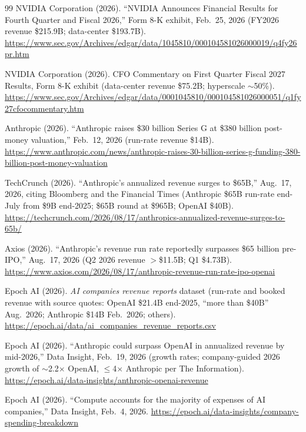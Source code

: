 \documentclass[11pt,letterpaper]{article}
\begin{document}
\begin{thebibliography}{99}
NVIDIA Corporation (2026). ``NVIDIA Announces Financial Results for Fourth Quarter and Fiscal 2026,'' Form 8-K exhibit, Feb.~25, 2026 (FY2026 revenue \$215.9B; data-center \$193.7B). \url{https://www.sec.gov/Archives/edgar/data/1045810/000104581026000019/q4fy26pr.htm}

NVIDIA Corporation (2026). CFO Commentary on First Quarter Fiscal 2027 Results, Form 8-K exhibit (data-center revenue \$75.2B; hyperscale $\sim$50\%). \url{https://www.sec.gov/Archives/edgar/data/0001045810/000104581026000051/q1fy27cfocommentary.htm}

Anthropic (2026). ``Anthropic raises \$30 billion Series G at \$380 billion post-money valuation,'' Feb.~12, 2026 (run-rate revenue \$14B). \url{https://www.anthropic.com/news/anthropic-raises-30-billion-series-g-funding-380-billion-post-money-valuation}

TechCrunch (2026). ``Anthropic's annualized revenue surges to \$65B,'' Aug.~17, 2026, citing Bloomberg and the Financial Times (Anthropic \$65B run-rate end-July from \$9B end-2025; \$65B round at \$965B; OpenAI \$40B). \url{https://techcrunch.com/2026/08/17/anthropics-annualized-revenue-surges-to-65b/}

Axios (2026). ``Anthropic's revenue run rate reportedly surpasses \$65 billion pre-IPO,'' Aug.~17, 2026 (Q2 2026 revenue $>$\$11.5B; Q1 \$4.73B). \url{https://www.axios.com/2026/08/17/anthropic-revenue-run-rate-ipo-openai}

Epoch AI (2026). \textit{AI companies revenue reports} dataset (run-rate and booked revenue with source quotes: OpenAI \$21.4B end-2025, ``more than \$40B'' Aug.~2026; Anthropic \$14B Feb.~2026; others). \url{https://epoch.ai/data/ai_companies_revenue_reports.csv}

Epoch AI (2026). ``Anthropic could surpass OpenAI in annualized revenue by mid-2026,'' Data Insight, Feb.~19, 2026 (growth rates; company-guided 2026 growth of $\sim$2.2$\times$ OpenAI, $\le$4$\times$ Anthropic per The Information). \url{https://epoch.ai/data-insights/anthropic-openai-revenue}

Epoch AI (2026). ``Compute accounts for the majority of expenses of AI companies,'' Data Insight, Feb.~4, 2026. \url{https://epoch.ai/data-insights/company-spending-breakdown}


\end{thebibliography}
\end{document}
